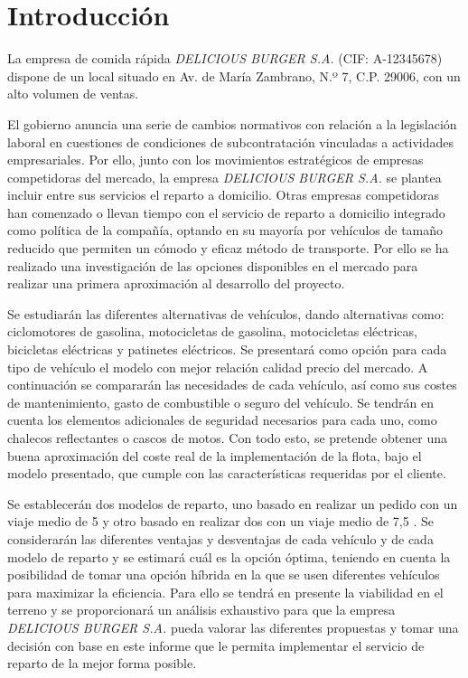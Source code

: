 \section{Introducción}

La empresa de comida rápida \textit{DELICIOUS BURGER S.A.} (CIF: A-12345678) dispone de un local situado en Av. de María Zambrano, N.º 7, C.P. 29006, con un alto volumen de ventas.

El gobierno anuncia una serie de cambios normativos con relación a la legislación laboral en cuestiones de condiciones de subcontratación vinculadas a actividades empresariales. Por ello, junto con los movimientos estratégicos de empresas competidoras del mercado, la empresa \textit{DELICIOUS BURGER S.A.} se plantea incluir entre sus servicios el reparto a domicilio. Otras empresas competidoras han comenzado o llevan tiempo con el servicio de reparto a domicilio integrado como política de la compañía, optando en su mayoría por vehículos de tamaño reducido que permiten un cómodo y eficaz método de transporte. Por ello se ha realizado una investigación de las opciones disponibles en el mercado para realizar una primera aproximación al desarrollo del proyecto.

Se estudiarán las diferentes alternativas de vehículos, dando alternativas como: ciclomotores de gasolina, motocicletas de gasolina, motocicletas eléctricas, bicicletas eléctricas y patinetes eléctricos. Se presentará como opción para cada tipo de vehículo el modelo con mejor relación calidad precio del mercado. A continuación se compararán las necesidades de cada vehículo, así como sus costes de mantenimiento, gasto de combustible o seguro del vehículo. Se tendrán en cuenta los elementos adicionales de seguridad necesarios para cada uno, como chalecos reflectantes o cascos de motos. Con todo esto, se pretende obtener una buena aproximación del coste real de la implementación de la flota, bajo el modelo presentado, que cumple con las características requeridas por el cliente.

Se establecerán dos modelos de reparto, uno basado en realizar un pedido con un viaje medio de 5  y otro basado en realizar dos con un viaje medio de 7,5 . Se considerarán las diferentes ventajas y desventajas de cada vehículo y de cada modelo de reparto y se estimará cuál es la opción óptima, teniendo en cuenta la posibilidad de tomar una opción híbrida en la que se usen diferentes vehículos para maximizar la eficiencia. Para ello se tendrá en presente la viabilidad en el terreno y se proporcionará un análisis exhaustivo para que la empresa \textit{DELICIOUS BURGER S.A.} pueda valorar las diferentes propuestas y tomar una decisión con base en este informe que le permita implementar el servicio de reparto de la mejor forma posible.

